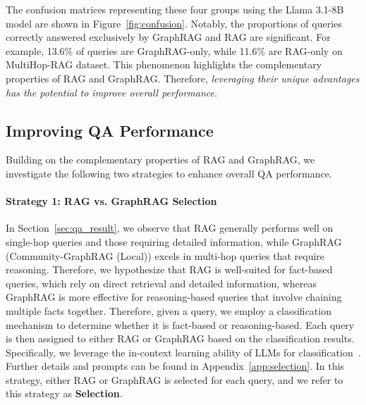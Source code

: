 {{The confusion matrices representing these four groups using the Llama 3.1-8B model are shown in Figure~\ref{fig:confusion}. Notably, the proportions of queries correctly answered exclusively by GraphRAG and RAG are significant. For example, 13.6\% of queries are GraphRAG-only, while 11.6\% are RAG-only on MultiHop-RAG dataset. This phenomenon highlights the complementary properties of RAG and GraphRAG.
Therefore, {\it leveraging their unique advantages has the potential to improve overall performance}.







\subsection{Improving QA Performance}
\label{sec:improve_qa}
Building on the complementary properties of RAG and GraphRAG, we investigate the following two strategies to enhance overall QA performance.

\vspace{-0.05in}
\paragraph{Strategy 1: RAG vs. GraphRAG Selection}
In Section~\ref{sec:qa_result}, we observe that RAG generally performs well on single-hop queries and those requiring detailed information, while GraphRAG (Community-GraphRAG (Local)) excels in multi-hop queries that require reasoning. Therefore, we hypothesize that RAG is well-suited for fact-based queries, which rely on direct retrieval and detailed information, whereas GraphRAG is more effective for reasoning-based queries that involve chaining multiple facts together. Therefore, given a query, we employ a classification mechanism to determine whether it is fact-based or reasoning-based. Each query is then assigned to either RAG or GraphRAG based on the classification results. Specifically, we leverage the in-context learning ability of LLMs for classification~\cite{dong2022survey, wei2023larger}. Further details and prompts can be found in Appendix~\ref{app:selection}. In this strategy, either RAG or GraphRAG is selected for each query, and we refer to this strategy as \textbf{Selection}.

}}
